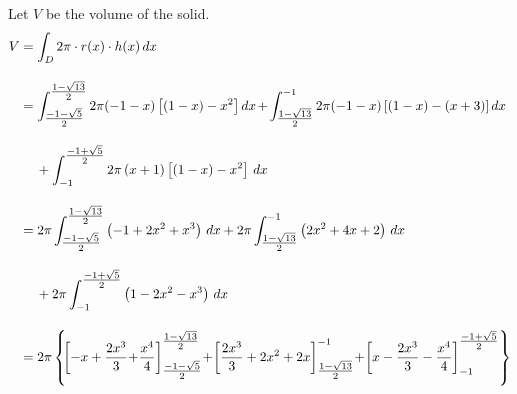 \documentclass[a4paper, 12pt]{article}
\begin{document}
\begin{enumerate}[leftmargin=*,label=\textbf{\arabic*.}]
\begin{center}
\end{center}

Let $V$ be the volume of the solid.
\begin{align*}V&=\int_D2\pi\cdot r(x)\cdot h(x)\,dx\\[1em]&=\int_{\textstyle\frac{-1-\sqrt5}2}^{\textstyle\frac{1-\sqrt{13}}2}2\pi(-1-x)\left[\left(1-x\right)-x^2\right]dx\hspace{-0.1em}+\hspace{-0.1em}\int_{\textstyle\frac{1-\sqrt{13}}2}^{-1}2\pi(-1-x)\left[\left(1-x\right)-\left(x+3\right)\right]dx\\[1em]&\quad\:+\int_{-1}^{\textstyle\frac{-1+\sqrt5}2}2\pi\left(x+1\right)\left[\left(1-x\right)-x^2\right]\,dx\\[1em]&=2\pi\int_{\textstyle\frac{-1-\sqrt5}2}^{\textstyle\frac{1-\sqrt{13}}2}\left(-1+2x^2+x^3\right)\,dx+2\pi\int_{\textstyle\frac{1-\sqrt{13}}2}^{-1}\left(2x^2+4x+2\right)\,dx\\[1em]&\quad\:+2\pi\int_{-1}^{\textstyle\frac{-1+\sqrt5}2}\left(1-2x^2-x^3\right)\,dx\\[1em]&=2\pi\left\{\hspace{-0.2em}\left[-x+\frac{2x^3}3\hspace{-0.2em}+\hspace{-0.2em}\frac{x^4}4\right]_{\textstyle\frac{-1-\sqrt5}2}^{\textstyle\frac{1-\sqrt{13}}2}\hspace{-0.2em}+\hspace{-0.2em}\left[\frac{2x^3}3+2x^2+2x\right]_{\textstyle\frac{1-\sqrt{13}}2}^{-1}\hspace{-0.2em}+\hspace{-0.2em}\left[x-\frac{2x^3}3-\frac{x^4}4\right]_{-1}^{\textstyle\frac{-1+\sqrt5}2}\right\}\end{align*}

\newpage


\end{enumerate}
\end{document}
